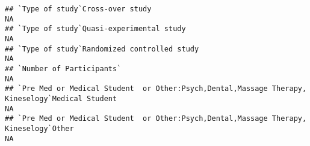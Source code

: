 \documentclass[]{article}
\begin{document}
\begin{verbatim}
## `Type of study`Cross-over study                                                                                                                                                                                                                                                                                                                                                                                                                                                      NA
## `Type of study`Quasi-experimental study                                                                                                                                                                                                                                                                                                                                                                                                                                              NA
## `Type of study`Randomized controlled study                                                                                                                                                                                                                                                                                                                                                                                                                                           NA
## `Number of Participants`                                                                                                                                                                                                                                                                                                                                                                                                                                                             NA
## `Pre Med or Medical Student  or Other:Psych,Dental,Massage Therapy, Kineselogy`Medical Student                                                                                                                                                                                                                                                                                                                                                                                       NA
## `Pre Med or Medical Student  or Other:Psych,Dental,Massage Therapy, Kineselogy`Other                                                                                                                                                                                                                                                                                                                                                                                                 NA

\end{verbatim}
\end{document}
